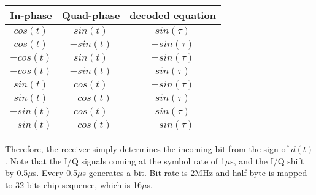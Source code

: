 \begin{table}[h!]
\centering
	\begin{tabular}{|c|c|c|}
		\hline
		In-phase & Quad-phase 	& decoded equation \\ \hline	
		$cos(t)$ & $sin(t)$		& $sin(\tau)$\\ \hline
		$cos(t)$ & $-sin(t)$	& $-sin(\tau)$\\ \hline
		$-cos(t)$ & $sin(t)$	& $-sin(\tau)$\\ \hline
		$-cos(t)$ & $-sin(t)$	& $sin(\tau)$\\ \hline
		$sin(t)$ & $cos(t)$		& $-sin(\tau)$\\ \hline
		$sin(t)$ & $-cos(t)$	& $sin(\tau)$\\ \hline
		$-sin(t)$ & $cos(t)$	& $sin(\tau)$\\ \hline
		$-sin(t)$ & $-cos(t)$	& $-sin(\tau)$\\ \hline
	\end{tabular}
	\label{tab:demux}
	\caption{}
\end{table}

Therefore, the receiver simply determines the incoming bit from the sign of $d(t)$. Note that the I/Q signals coming
at the symbol rate of 1$\mu$s, and the I/Q shift by 0.5$\mu$s. Every 0.5$\mu$s generates a bit. Bit rate is 2MHz and 
half-byte is mapped to 32 bits chip sequence, which is 16$\mu$s.
